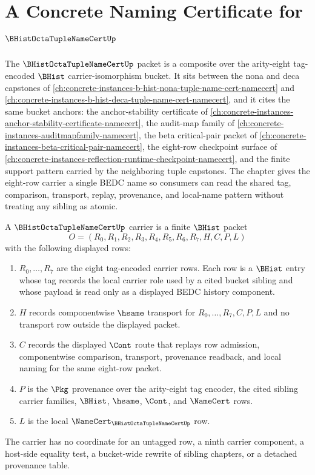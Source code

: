 \chapter{A Concrete Naming Certificate for $\BHistOctaTupleNameCertUp$}
\label{ch:concrete-instances-b-hist-octa-tuple-name-cert-namecert}

The $\BHistOctaTupleNameCertUp$ packet is a composite over the arity-eight tag-encoded $\BHist$ carrier-isomorphism bucket. It sits between the nona and deca capstones of \autoref{ch:concrete-instances-b-hist-nona-tuple-name-cert-namecert} and \autoref{ch:concrete-instances-b-hist-deca-tuple-name-cert-namecert}, and it cites the same bucket anchors: the anchor-stability certificate of \autoref{ch:concrete-instances-anchor-stability-certificate-namecert}, the audit-map family of \autoref{ch:concrete-instances-auditmapfamily-namecert}, the beta critical-pair packet of \autoref{ch:concrete-instances-beta-critical-pair-namecert}, the eight-row checkpoint surface of \autoref{ch:concrete-instances-reflection-runtime-checkpoint-namecert}, and the finite support pattern carried by the neighboring tuple capstones. The chapter gives the eight-row carrier a single BEDC name so consumers can read the shared tag, comparison, transport, replay, provenance, and local-name pattern without treating any sibling as atomic.

\begin{definition}
\label{def:b-hist-octa-tuple-name-cert-carrier}
A $\BHistOctaTupleNameCertUp$ carrier is a finite $\BHist$ packet
$$
O=(R_0,R_1,R_2,R_3,R_4,R_5,R_6,R_7,H,C,P,L)
$$
with the following displayed rows:
\begin{enumerate}
\item $R_0,\ldots,R_7$ are the eight tag-encoded carrier rows. Each row is a $\BHist$ entry whose tag records the local carrier role used by a cited bucket sibling and whose payload is read only as a displayed BEDC history component.
\item $H$ records componentwise $\hsame$ transport for $R_0,\ldots,R_7,C,P,L$ and no transport row outside the displayed packet.
\item $C$ records the displayed $\Cont$ route that replays row admission, componentwise comparison, transport, provenance readback, and local naming for the same eight-row packet.
\item $P$ is the $\Pkg$ provenance over the arity-eight tag encoder, the cited sibling carrier families, $\BHist$, $\hsame$, $\Cont$, and $\NameCert$ rows.
\item $L$ is the local $\NameCert_{\BHistOctaTupleNameCertUp}$ row.
\end{enumerate}
The carrier has no coordinate for an untagged row, a ninth carrier component, a host-side equality test, a bucket-wide rewrite of sibling chapters, or a detached provenance table.
\end{definition}

